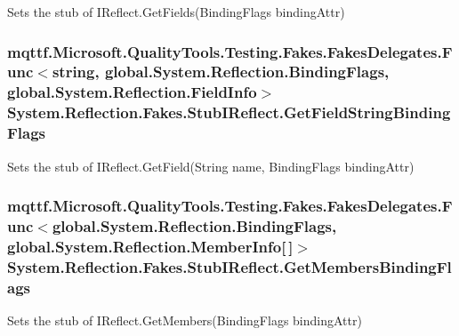Sets the stub of I\-Reflect.\-Get\-Fields(\-Binding\-Flags binding\-Attr)

\hypertarget{class_system_1_1_reflection_1_1_fakes_1_1_stub_i_reflect_a175f58085b2c07113806297f0047e7ca}{
\subsubsection[{Get\-Field\-String\-Binding\-Flags}]{\setlength{\rightskip}{0pt plus 5cm}mqttf.\-Microsoft.\-Quality\-Tools.\-Testing.\-Fakes.\-Fakes\-Delegates.\-Func$<$string, global.\-System.\-Reflection.\-Binding\-Flags, global.\-System.\-Reflection.\-Field\-Info$>$ System.\-Reflection.\-Fakes.\-Stub\-I\-Reflect.\-Get\-Field\-String\-Binding\-Flags}}\label{class_system_1_1_reflection_1_1_fakes_1_1_stub_i_reflect_a175f58085b2c07113806297f0047e7ca}


Sets the stub of I\-Reflect.\-Get\-Field(\-String name, Binding\-Flags binding\-Attr)

\hypertarget{class_system_1_1_reflection_1_1_fakes_1_1_stub_i_reflect_a7b5d3790ac11225f66c09d645a6f8464}{
\subsubsection[{Get\-Members\-Binding\-Flags}]{\setlength{\rightskip}{0pt plus 5cm}mqttf.\-Microsoft.\-Quality\-Tools.\-Testing.\-Fakes.\-Fakes\-Delegates.\-Func$<$global.\-System.\-Reflection.\-Binding\-Flags, global.\-System.\-Reflection.\-Member\-Info\mbox{[}$\,$\mbox{]}$>$ System.\-Reflection.\-Fakes.\-Stub\-I\-Reflect.\-Get\-Members\-Binding\-Flags}}\label{class_system_1_1_reflection_1_1_fakes_1_1_stub_i_reflect_a7b5d3790ac11225f66c09d645a6f8464}


Sets the stub of I\-Reflect.\-Get\-Members(\-Binding\-Flags binding\-Attr)

